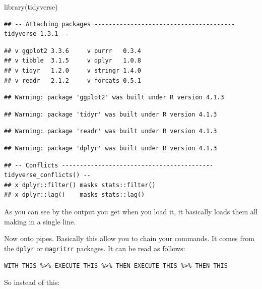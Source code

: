\documentclass[
]{book}
\newenvironment{Shaded}{\begin{snugshade}}{\end{snugshade}}
\newcommand{\FunctionTok}[1]{\textcolor[rgb]{0.00,0.00,0.00}{#1}}
\newcommand{\NormalTok}[1]{#1}
\begin{document}
\begin{Shaded}
\begin{Highlighting}[]
\FunctionTok{library}\NormalTok{(tidyverse)}
\end{Highlighting}
\end{Shaded}

\begin{verbatim}
## -- Attaching packages --------------------------------------- tidyverse 1.3.1 --
\end{verbatim}

\begin{verbatim}
## v ggplot2 3.3.6     v purrr   0.3.4
## v tibble  3.1.5     v dplyr   1.0.8
## v tidyr   1.2.0     v stringr 1.4.0
## v readr   2.1.2     v forcats 0.5.1
\end{verbatim}

\begin{verbatim}
## Warning: package 'ggplot2' was built under R version 4.1.3
\end{verbatim}

\begin{verbatim}
## Warning: package 'tidyr' was built under R version 4.1.3
\end{verbatim}

\begin{verbatim}
## Warning: package 'readr' was built under R version 4.1.3
\end{verbatim}

\begin{verbatim}
## Warning: package 'dplyr' was built under R version 4.1.3
\end{verbatim}

\begin{verbatim}
## -- Conflicts ------------------------------------------ tidyverse_conflicts() --
## x dplyr::filter() masks stats::filter()
## x dplyr::lag()    masks stats::lag()
\end{verbatim}

As you can see by the output you get when you load it, it basically loads them all making in a single line.

Now onto pipes.
Basically this allow you to chain your commands.
It comes from the \texttt{dplyr} or \texttt{magritrr} packages.
It can be read as follows:

\texttt{WITH\ THIS\ \%\textgreater{}\%\ EXECUTE\ THIS\ \%\textgreater{}\%\ THEN\ EXECUTE\ THIS\ \%\textgreater{}\%\ THEN\ THIS}

So instead of this:
\end{document}
